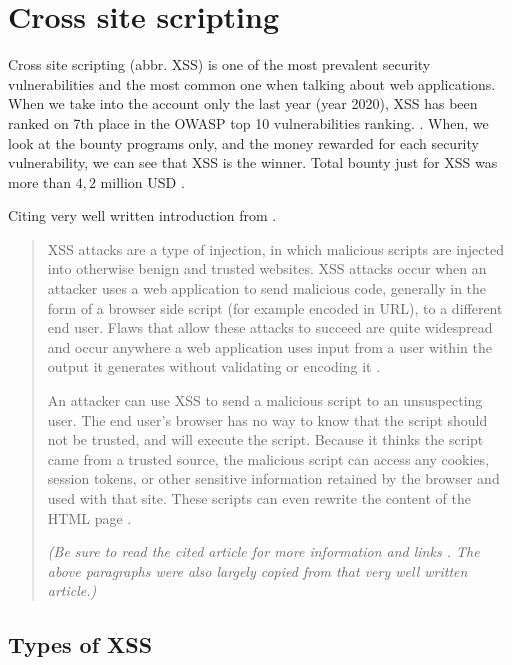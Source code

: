 \chapter{Cross site scripting}

\label{chapter:xss} %

Cross site scripting (abbr. XSS) is one of the most prevalent security vulnerabilities and the most
common one when talking about web applications. When we take into the account only the last year
(year 2020), XSS has been ranked on 7th place in the OWASP top 10 vulnerabilities ranking.
\cite{owasp_top_ten_vulns}. When, we look at the bounty programs only, and the money rewarded for
each security vulnerability, we can see that XSS is the winner. Total bounty just for XSS was more
than $4,2$ million USD \cite{top_ten_rewarded_vulns}.

Citing very well written introduction from \cite{xss_owasp_intro}.

\begin{quotation}
  XSS attacks are a type of injection, in which malicious scripts are injected into otherwise benign
  and trusted websites. XSS attacks occur when an attacker uses a web application to send malicious
  code, generally in the form of a browser side script (for example encoded in URL), to a different
  end user. Flaws that allow these attacks to succeed are quite widespread and occur anywhere a web
  application uses input from a user within the output it generates without validating or encoding
  it \cite{xss_owasp_intro}.

  An attacker can use XSS to send a malicious script to an unsuspecting user. The end user’s browser
  has no way to know that the script should not be trusted, and will execute the script. Because it
  thinks the script came from a trusted source, the malicious script can access any cookies, session
  tokens, or other sensitive information retained by the browser and used with that site. These
  scripts can even rewrite the content of the HTML page \cite{xss_owasp_intro}.

  \emph{(Be sure to read the cited article for more information and links \cite{xss_owasp_intro}.
    The above paragraphs were also largely copied from that very well written article.)}
\end{quotation}

\section{Types of XSS}
\label{chapter:xss:types}

